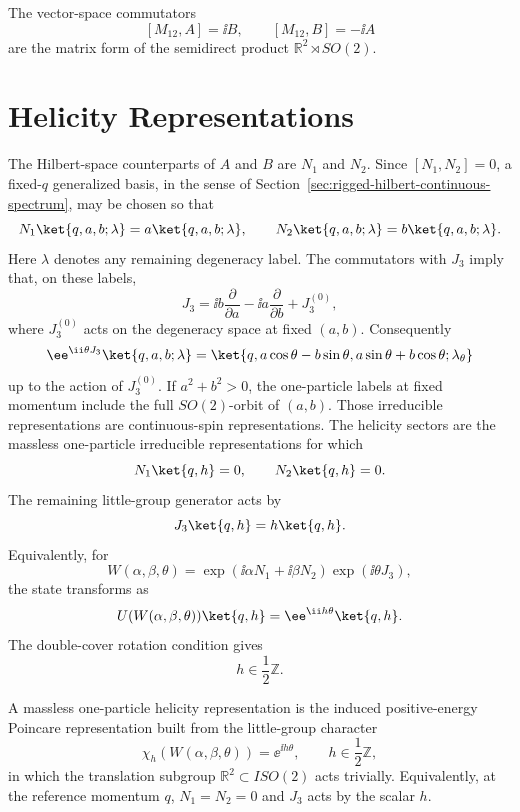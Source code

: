 The vector-space commutators
\[
  [M_{12},A]=\ii B,
  \qquad
  [M_{12},B]=-\ii A
\]
are the matrix form of the semidirect product
\(\mathbb R^2\rtimes SO(2)\).

\section{Helicity Representations}

The Hilbert-space counterparts of \(A\) and \(B\) are \(N_1\) and \(N_2\).
Since \([N_1,N_2]=0\), a fixed-\(q\) generalized basis, in the sense of
Section~\ref{sec:rigged-hilbert-continuous-spectrum}, may be chosen so that
\[
  N_1\ket{q,a,b;\lambda}=a\ket{q,a,b;\lambda},
  \qquad
  N_2\ket{q,a,b;\lambda}=b\ket{q,a,b;\lambda}.
\]
Here \(\lambda\) denotes any remaining degeneracy label. The commutators with
\(J_3\) imply that, on these labels,
\[
  J_3
  =
  \ii b\frac{\partial}{\partial a}
  -
  \ii a\frac{\partial}{\partial b}
  +
  J_3^{(0)},
\]
where \(J_3^{(0)}\) acts on the degeneracy space at fixed \((a,b)\).
Consequently
\[
  \ee^{\ii\theta J_3}\ket{q,a,b;\lambda}
  =
  \ket{q,a\cos\theta-b\sin\theta,
          a\sin\theta+b\cos\theta;\lambda_\theta}
\]
up to the action of \(J_3^{(0)}\). If \(a^2+b^2>0\), the one-particle
labels at fixed momentum include the full \(SO(2)\)-orbit of \((a,b)\).
Those irreducible representations are continuous-spin representations. The
helicity sectors are the massless one-particle irreducible representations
for which
\[
  N_1\ket{q,h}=0,
  \qquad
  N_2\ket{q,h}=0.
\]
The remaining little-group generator acts by
\[
  J_3\ket{q,h}=h\ket{q,h}.
\]
Equivalently, for
\[
  W(\alpha,\beta,\theta)
  =
  \exp(\ii\alpha N_1+\ii\beta N_2)\exp(\ii\theta J_3),
\]
the state transforms as
\[
  U(W(\alpha,\beta,\theta))\ket{q,h}
  =
  \ee^{\ii h\theta}\ket{q,h}.
\]
The double-cover rotation condition gives
\[
  h\in\frac12\mathbb Z.
\]

\begin{definition}
\label{def:massless-helicity-representation}
  A massless one-particle helicity representation is the induced
  positive-energy Poincare representation built from the little-group
  character
  \[
    \chi_h(W(\alpha,\beta,\theta))=\ee^{\ii h\theta},
    \qquad h\in\frac12\mathbb Z ,
  \]
  in which the translation subgroup \(\mathbb R^2\subset ISO(2)\) acts
  trivially.  Equivalently, at the reference momentum \(q\),
  \(N_1=N_2=0\) and \(J_3\) acts by the scalar \(h\).
\end{definition}

